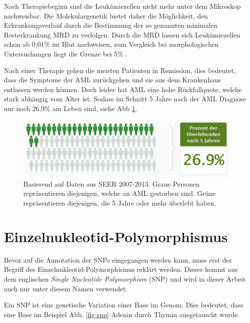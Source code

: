 Nach Therapiebeginn sind die Leukämiezellen nicht mehr unter dem Mikroskop nachweisbar. Die Molekulargenetik bietet daher die Möglichkeit, den Erkrankungsverlauf durch die Bestimmung der so genannten minimalen Resterkrankung \ac{MRD} zu verfolgen. Durch die \ac{MRD} lassen sich Leukämiezellen schon ab 0,01\% im Blut nachweisen, zum Vergleich bei morphologischen Untersuchungen liegt die Grenze bei 5\% \cite{Ossenkoppele.2016}.

Nach einer Therapie gehen die meisten Patienten in Remission, dies bedeutet, dass die Symptome der \ac{AML} zurückgehen und sie aus dem Krankenhaus entlassen werden können. Doch leider hat \ac{AML} eine hohe Rückfallquote, welche stark abhängig vom Alter ist. Sodass im Schnitt 5 Jahre nach der \ac{AML} Diagnose nur noch 26,9\% am Leben sind, siehe \ac{Abb} \ref{fig:seer_aml_rate}.

\begin{figure}
    \centering
    \includegraphics[width=.95\textwidth]{images/SEER_survival_rate_AML.png}
    \caption{Basierend auf Daten aus SEER 2007-2013. Graue Personen repräsentieren diejenigen, welche an \ac{AML} gestorben sind. Grüne repräsentieren diejenigen, die 5 Jahre oder mehr überlebt haben\protect\footnotemark{}.}
    \label{fig:seer_aml_rate}
\end{figure}




\section{Einzelnukleotid-Polymorphismus}
\label{sec:snp_exp}

Bevor auf die Annotation der \ac{SNP}s eingegangen werden kann, muss erst der Begriff des Einzelnukleotid-Polymorphismus erklärt werden. Dieser kommt aus dem englischen \emph{Single Nucleotide Polymorphism} (SNP) und wird in dieser Arbeit auch nur unter diesem Namen verwendet.

Ein \ac{SNP} ist eine genetische Variation einer Base im Genom. Dies bedeutet, dass eine Base im Beispiel Abb. \ref{fig:snp} Adenin durch Thymin ausgetauscht wurde.

